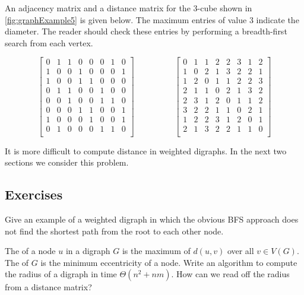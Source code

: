 \begin{Example}
An adjacency matrix and a distance matrix for the 3-cube shown in
\cref{fig:graphExample5} is given below.  The maximum entries of
value $3$ indicate the diameter. The reader should check these entries
by performing a breadth-first search from each vertex.

\[
\left[
\begin{array}{cccccccc}
0& 1& 1& 0& 0& 0& 1& 0\\
1& 0& 0& 1& 0& 0& 0& 1 \\
1& 0& 0& 1& 1& 0& 0& 0\\
0& 1& 1& 0& 0& 1& 0& 0 \\
0& 0& 1& 0& 0& 1& 1& 0 \\
0& 0& 0& 1& 1& 0& 0& 1 \\
1& 0& 0& 0& 1& 0& 0& 1 \\
0& 1& 0& 0& 0& 1& 1& 0 \\
\end{array}
\right]
\hspace{2cm}
\left[
\begin{array}{cccccccc}
0& 1& 1& 2& 2& 3& 1& 2\\
1& 0& 2& 1& 3& 2& 2& 1\\
1& 2& 0& 1& 1& 2& 2& 3\\
2& 1& 1& 0& 2& 1& 3& 2\\
2& 3& 1& 2& 0& 1& 1& 2\\
3& 2& 2& 1& 1& 0& 2& 1\\
1& 2& 2& 3& 1& 2& 0& 1\\
2& 1& 3& 2& 2& 1& 1& 0\\
\end{array}
\right]
\]

\end{Example}

It is more difficult to compute distance in weighted digraphs. In the
next two sections we consider this problem.

\subsection*{Exercises}

\begin{Exercise}
\label{ex:BFSfails}
Give an example of a weighted digraph in which the obvious BFS approach
does not find the shortest path from the root to each other node.
\end{Exercise}

\begin{Exercise}
\label{ex:radius}
The  of a node $u$ in a  digraph $G$  is the
maximum of $d(u, v)$ over all $v\in V(G)$. The  of $G$
is the minimum eccentricity of a node. Write an
algorithm to compute the radius of a digraph in time $\Theta(n^2 +
nm)$. How can we read off the radius from a distance matrix?
\end{Exercise}

